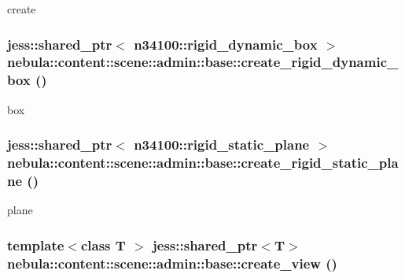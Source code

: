 create \hypertarget{classnebula_1_1content_1_1scene_1_1admin_1_1base_ad48ed9a2603206a825343fad50d16e62}{
\subsubsection[{create\_\-rigid\_\-dynamic\_\-box}]{\setlength{\rightskip}{0pt plus 5cm}jess::shared\_\-ptr$<$ {\bf n34100::rigid\_\-dynamic\_\-box} $>$ nebula::content::scene::admin::base::create\_\-rigid\_\-dynamic\_\-box ()}}
\label{classnebula_1_1content_1_1scene_1_1admin_1_1base_ad48ed9a2603206a825343fad50d16e62}


box \hypertarget{classnebula_1_1content_1_1scene_1_1admin_1_1base_a628327c71fbffd119a3b7dadf188edd6}{
\subsubsection[{create\_\-rigid\_\-static\_\-plane}]{\setlength{\rightskip}{0pt plus 5cm}jess::shared\_\-ptr$<$ {\bf n34100::rigid\_\-static\_\-plane} $>$ nebula::content::scene::admin::base::create\_\-rigid\_\-static\_\-plane ()}}
\label{classnebula_1_1content_1_1scene_1_1admin_1_1base_a628327c71fbffd119a3b7dadf188edd6}


plane \hypertarget{classnebula_1_1content_1_1scene_1_1admin_1_1base_a702113c4d98aa72428fca6946c14bc77}{
\subsubsection[{create\_\-view}]{\setlength{\rightskip}{0pt plus 5cm}template$<$class T $>$ jess::shared\_\-ptr$<$T$>$ nebula::content::scene::admin::base::create\_\-view ()}}
\label{classnebula_1_1content_1_1scene_1_1admin_1_1base_a702113c4d98aa72428fca6946c14bc77}


